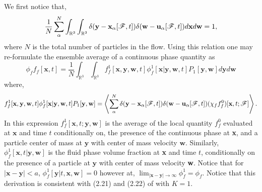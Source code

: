 We first notice that, 
\begin{equation}
    \frac{1}{N}\sum_\alpha^N
    \int_{\mathbb{R}^3}
    \int_{\mathbb{R}^3}
    \delta(\textbf{y}-\textbf{x}_\alpha[\mathscr{F},t])
    \delta(\textbf{w}-\textbf{u}_\alpha[\mathscr{F},t])
    d\textbf{x}
    d\textbf{w}
    = 1,
\end{equation}
where $N$ is the total number of particles in the flow. 
Using this relation one may re-formulate the ensemble average of a continuous phase quantity as 
\begin{equation}
    \phi_f f_f[\textbf{x},t]
    = 
    \frac{1}{N}
    \int_{\mathbb{R}^3}
    \int_{\mathbb{R}^3}
    f_f^1[\textbf{x},\textbf{y},\textbf{w},t] \phi_f^1[\textbf{x}|\textbf{y},\textbf{w},t]  P_1[\textbf{y},\textbf{w}] 
    d\textbf{y} 
    d\textbf{w}
    \label{eq:conditional_averaged_fluid}
\end{equation}
where,
\begin{equation*}
    f_f^1[\textbf{x},\textbf{y},\textbf{w},t] \phi_f^1[\textbf{x}|\textbf{y},\textbf{w},t]  P_1[\textbf{y},\textbf{w}]
    =     
    \left<
    \sum_\alpha^N 
    \delta(\textbf{y}-\textbf{x}_\alpha[\mathscr{F},t])
     \delta(\textbf{w}-\textbf{u}_\alpha[\mathscr{F},t])
    (\chi_f
    f^0_f)[\textbf{x},t;\mathscr{F}]
    \right>.
\end{equation*}
In this expression $f_f^1[\textbf{x},t;\textbf{y},\textbf{w}]$ is the average of the local quantity $f_f^0$ evaluated at $\textbf{x}$ and time $t$ conditionally on, the presence of the continuous phase at \textbf{x}, and a particle center of mass at $\textbf{y}$ with center of mass velocity $\textbf{w}$. 
Similarly, $\phi_f^1[\textbf{x},t|\textbf{y},\textbf{w}]$ is the fluid phase volume fraction at \textbf{x} and time $t$, conditionally on the presence of a particle at $\textbf{y}$ with center of mass velocity \textbf{w}. 
Notice that for $|\textbf{x} - \textbf{y}| < a$, $\phi_f^1[\textbf{y}|t,\textbf{x},\textbf{w}] = 0$ however at, 
$\lim_{|\textbf{x} - \textbf{y}| \to \infty} \phi_f^1 = \phi_f$. 
Notice that this derivation is consistent with (2.21) and (2.22) of \citet{zhang1994ensemble} with $K = 1$. 

